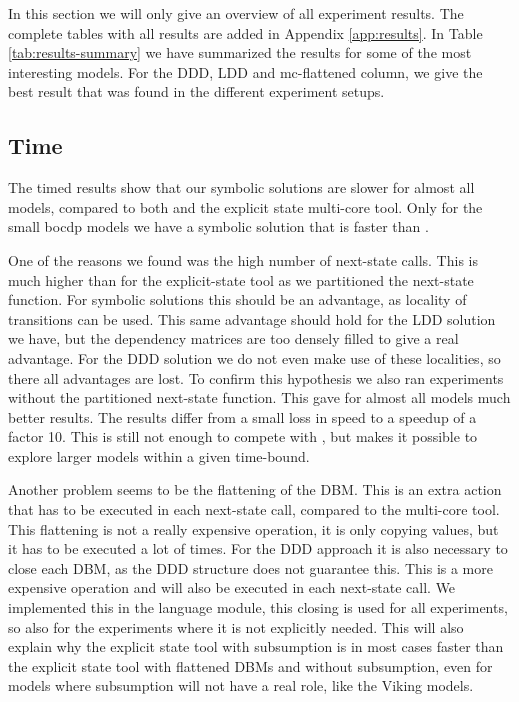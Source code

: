 In this section we will only give an overview of all experiment results. The complete tables with all results are added in Appendix \ref{app:results}. In Table \ref{tab:results-summary}  we have summarized the results for some of the most interesting models. For the DDD, LDD and mc-flattened column, we give the best result that was found in the different experiment setups. 

\subsection{Time}
The timed results show that our symbolic solutions are slower for almost all models, compared to both \uppaal{} and the explicit state multi-core tool. Only for the small bocdp models we have a symbolic solution that is faster than \uppaal{}. 

One of the reasons we found was the high number of next-state calls. This is much higher than for the explicit-state tool as we partitioned the next-state function. For symbolic solutions this should be an advantage, as locality of transitions can be used. This same advantage should hold for the LDD solution we have, but the dependency matrices are too densely filled to give a real advantage. For the DDD solution we do not even make use of these localities, so there all advantages are lost. To confirm this hypothesis we also ran experiments without the partitioned next-state function. This gave for almost all models much better results. The results differ from a small loss in speed to a speedup of a factor 10. This is still not enough to compete with \uppaal{}, but makes it possible to explore larger models within a given time-bound. 

Another problem seems to be the flattening of the DBM. This is an extra action that has to be executed in each next-state call, compared to the multi-core tool. This flattening is not a really expensive operation, it is only copying values, but it has to be executed a lot of times. For the DDD approach it is also necessary to close each DBM, as the DDD structure does not guarantee this. This is a more expensive operation and will also be executed in each next-state call. We implemented this in the language module, this closing is used for all experiments, so also for the experiments where it is not explicitly needed. This will also explain why the explicit state tool with subsumption is in most cases faster than the explicit state tool with flattened DBMs and without subsumption, even for models where subsumption will not have a real role, like the Viking models.

